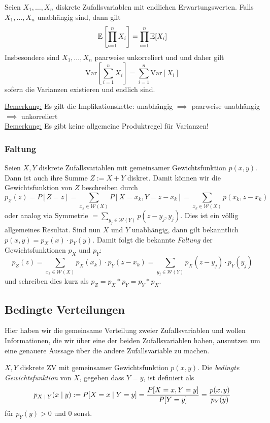 \begin{satz}
Seien $X_1,\dots, X_n$  diskrete Zufallsvariablen mit endlichen Erwartungswerten. Falls $X_1,\dots,X_n$ unabhängig sind, dann gilt
$$\mathbb{E}\left[\prod_{i=1}^n X_i\right] = \prod_{i=1}^n \mathbb{E}[X_i]$$ Insbesondere sind $X_1,\dots,X_n$ paarweise unkorreliert und und daher gilt
$$ \mbox{Var}\left[\sum_{i=1}^n X_i\right] = \sum_{i=1}^n \mbox{Var}[X_i]$$ sofern die Varianzen existieren und endlich sind.
\end{satz}
\underline{Bemerkung:} Es gilt die Implikationskette: unabhängig $\implies$ paarweise unabhängig $\implies$ unkorreliert\\

\underline{Bemerkung:} Es gibt keine allgemeine Produktregel für Varianzen!

\subsubsection*{Faltung}
Seien $X,Y$ diskrete Zufallsvariablen mit gemeinsamer Gewichtsfunktion $p(x,y)$. Dann ist auch ihre Summe $Z:=X+Y$ diskret. Damit können wir die Gewichtsfunktion von $Z$ beschreiben durch
$$ p_Z(z) = P[Z=z] = \sum_{x_k \in \mathcal{W}(X)} P[X=x_k, Y = z-x_k] = \sum_{x_k \in \mathcal{W}(X)} p(x_k, z-x_k)$$ oder analog via Symmetrie $= \sum_{y_j\in\mathcal{W}(Y)} p(z-y_j, y_j)$. Dies ist ein völlig allgemeines Resultat. Sind nun $X$ und $Y$ unabhängig, dann gilt bekanntlich $p(x,y)= p_X(x) \cdot p_Y(y)$. Damit folgt die bekannte \textit{Faltung} der Gewichtsfunktionen $p_X$ und $p_Y$:
$$ p_Z(z) = \sum_{x_k \in \mathcal{W}(X)} p_X(x_k) \cdot p_Y(z-x_k) = \sum_{y_j \in \mathcal{W}(Y)} p_X(z-y_j) \cdot p_Y(y_j)$$ und schreiben dies kurz als $p_Z = p_X * p_Y = p_Y * p_X$.

\subsection{Bedingte Verteilungen}
Hier haben wir die gemeinsame Verteilung zweier Zufallsvariablen und wollen Informationen, die wir über eine der beiden Zufallsvariablen haben, ausnutzen um eine genauere Aussage über die andere Zufallsvariable zu machen.

\begin{definition}
$X,Y$ diskrete ZV mit gemeinsamer Gewichtsfunktion $p(x,y)$. Die \textit{bedingte Gewichtsfunktion} von $X$, gegeben dass $Y=y$, ist definiert als
$$ p_{X \;|\; Y} (x \;|\; y) := P[X=x \;|\; Y=y] = \frac{P[X=x, Y = y]}{P[Y=y]} = \frac{p(x,y)}{p_Y(y)} $$
für $p_Y(y) >0$ und 0 sonst.
\end{definition}

